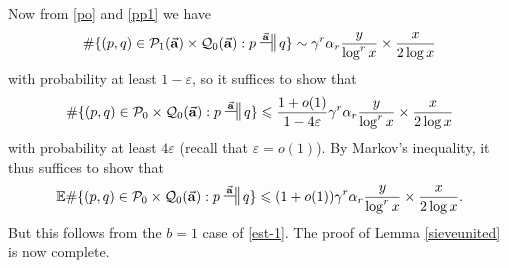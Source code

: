 \documentclass[11pt]{amsart}
\numberwithin{equation}{section}  %
\theoremstyle{remark}
\theoremstyle{plain}
\numberwithin{equation}{section}
\newcommand{\E}{\mathbb{E}}  %
\newcommand{\eps}{\ensuremath{\varepsilon}}
\renewcommand{\leq}{\leqslant}
\renewcommand{\(}{\left(}
\renewcommand{\)}{\right)}
\newcommand{\asym}{\sim}   %
\newcommand{\rel}{\nsststile{}{}}  %
\newcommand{\relra}{\nsdtstile{}{\vect{\mathbf{a}}}} %
\newcommand{\vect}[1]{{\ensuremath{\vec{#1}}}}
\newcommand{\PP}{\mathcal{P}}
\newcommand{\QQ}{\mathcal{Q}}
\newcommand{\main}{\operatorname{main}}
\begin{document}
Now from \eqref{po} and \eqref{pp1} we have
$$ 
\#  \{ (p,q) \in \PP_1(\vect{\mathbf{a}}) \times \QQ_0(\vect{\mathbf{a}}):  p \relra q \} \asym \gamma^r\alpha_r\frac y{\log^r x} \times \frac{x}{2\log x}  
$$
with probability at least $1-\eps$, so it suffices to show that
$$ 
\#  \{ (p,q) \in \PP_0 \times \QQ_0(\vect{\mathbf{a}}):  p \relra q \} \leq \frac{1+o(1)}{1-4\eps} \gamma^r\alpha_r\frac y{\log^r x} \times \frac{x}{2\log x}  
$$
with probability at least $4\eps$ (recall that $\eps=o(1)$).  By Markov's inequality, it thus suffices to show that
$$ 
\E \#  \{ (p,q) \in \PP_0 \times \QQ_0(\vect{\mathbf{a}}):  p \relra q \} \leq (1+o(1)) \gamma^r\alpha_r\frac y{\log^r x} \times \frac{x}{2\log x}.
$$
But this follows from the $b=1$ case of \eqref{est-1}.  The proof of Lemma \ref{sieveunited} is now complete.

\begin{comment}
\begin{proof}[Proof of Lemma \ref{sieveunited}] To begin with we select $\vect{\mathbf{a}}$ uniformly at random. Choose $P_2(\vect{\mathbf{a}})$ to be the set of $p \in P_0$ for which Lemma \ref{QQ1p_normal} holds, thus
\[ |Q_1(p;\vect{\mathbf{a}})| \rel \alpha_r \gamma^r \frac{y}{(\log x)^r} \rel \gamma^r |Q_0(p)|.\]
Let $R''_2(\vect{\mathbf{a}})$ be the set of all $q \in R^{\main}_2(\vect{\mathbf{a}})$ such that Lemma \ref{PP1qi} holds for \emph{all} $i = 0,1,2,\dots, r-1$, thus
\[ |P_1(q,i;\vect{\mathbf{a}})| \rel \gamma^{r-1} \alpha_r \frac{x}{2(\log x)^r} \rel \gamma^{r-1}|P_0(q,i)|.\]
Then parts (1), (2) and (3) of the lemma hold with probability $1 - o(1)$ in $\vect{\mathbf{a}}$, this being a consequence of Lemmas \ref{QQ1_normal}, \ref{QQ1p_normal} and \ref{PP1qi}. Part (4) does not quite hold as stated: we instead have the weaker property that for any $i \in \{0,1,\dots, r-1\}$ and any $q \in R''_2(\vect{\mathbf{a}})$ we have
\begin{equation}\label{eq460} |P_1(q,i;\vect{\mathbf{a}})| \rel \gamma^{r-1}\alpha_r \frac{x}{2(\log x)^r}.\end{equation}
Recall that we in fact claimed the stronger estimate
\begin{equation}\label{stronger} |P_2(\vect{\mathbf{a}}) \cap P_1(q,i;\vect{\mathbf{a}})| \rel \gamma^{r-1}\alpha_r \frac{x}{2(\log x)^r}.\end{equation}
To establish this we need some further technical arguments and will in fact need to make a specific choice of $\vect{\mathbf{a}}$ and then to refine $R''_2(\vect{\mathbf{a}})$ somewhat further. We claim first of all that there is a choice of $\vect{\mathbf{a}}$ such that we have


\end{comment}
\end{document}
